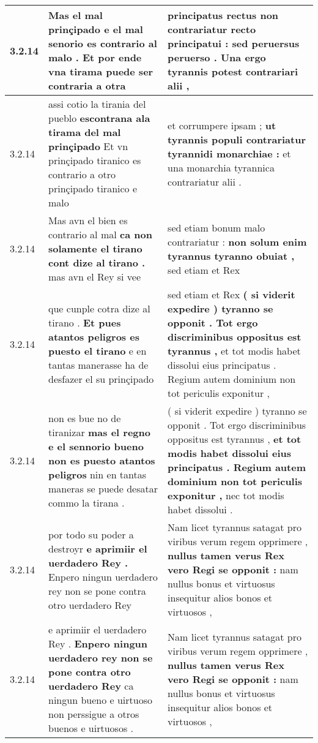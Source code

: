 \begin{tabular}{|p{1cm}|p{6.5cm}|p{6.5cm}|}
3.2.14 & Mas el mal prinçipado \textbf{ e el mal senorio es contrario al malo . } Et por ende vna tirama puede ser contraria a otra & principatus rectus non contrariatur recto principatui : \textbf{ sed peruersus peruerso . } Una ergo tyrannis potest contrariari alii , \\\hline
3.2.14 & assi cotio la tirania del pueblo \textbf{ escontrana ala tirama del mal prinçipado } Et vn prinçipado tiranico es contrario a otro prinçipado tiranico e malo & et corrumpere ipsam ; \textbf{ ut tyrannis populi contrariatur tyrannidi monarchiae : } et una monarchia tyrannica contrariatur alii . \\\hline
3.2.14 & Mas avn el bien es contrario al mal \textbf{ ca non solamente el tirano cont dize al tirano . } mas avn el Rey si vee & sed etiam bonum malo contrariatur : \textbf{ non solum enim tyrannus tyranno obuiat , } sed etiam et Rex \\\hline
3.2.14 & que cunple cotra dize al tirano . \textbf{ Et pues atantos peligros es puesto el tirano } e en tantas manerasse ha de desfazer el su prinçipado & sed etiam et Rex \textbf{ ( si viderit expedire ) tyranno se opponit . Tot ergo discriminibus oppositus est tyrannus , } et tot modis habet dissolui eius principatus . Regium autem dominium non tot periculis exponitur , \\\hline
3.2.14 & non es bue no de tiranizar \textbf{ mas el regno e el sennorio bueno non es puesto atantos peligros } nin en tantas maneras se puede desatar commo la tirana . & ( si viderit expedire ) tyranno se opponit . Tot ergo discriminibus oppositus est tyrannus , \textbf{ et tot modis habet dissolui eius principatus . Regium autem dominium non tot periculis exponitur , } nec tot modis habet dissolui . \\\hline
3.2.14 & por todo su poder a destroyr \textbf{ e aprimiir el uerdadero Rey . } Enpero ningun uerdadero rey non se pone contra otro uerdadero Rey & Nam licet tyrannus satagat pro viribus verum regem opprimere , \textbf{ nullus tamen verus Rex vero Regi se opponit : } nam nullus bonus et virtuosus insequitur alios bonos et virtuosos , \\\hline
3.2.14 & e aprimiir el uerdadero Rey . \textbf{ Enpero ningun uerdadero rey non se pone contra otro uerdadero Rey } ca ningun bueno e uirtuoso non perssigue a otros buenos e uirtuosos . & Nam licet tyrannus satagat pro viribus verum regem opprimere , \textbf{ nullus tamen verus Rex vero Regi se opponit : } nam nullus bonus et virtuosus insequitur alios bonos et virtuosos , \\\hline

\end{tabular}
